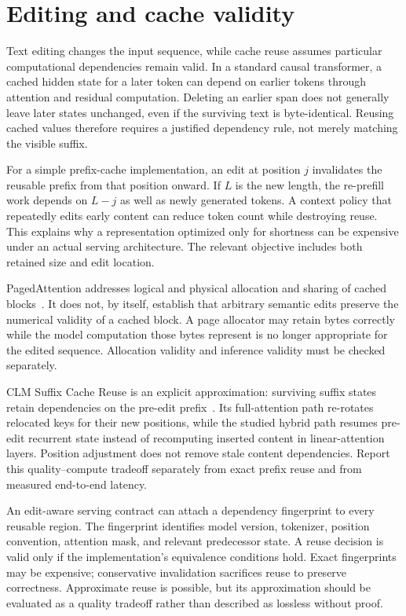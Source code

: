 \section{Editing and cache validity}\label{sec:C12:cache}
Text editing changes the input sequence, while cache reuse assumes particular computational dependencies remain valid. In a standard causal transformer, a cached hidden state for a later token can depend on earlier tokens through attention and residual computation. Deleting an earlier span does not generally leave later states unchanged, even if the surviving text is byte-identical. Reusing cached values therefore requires a justified dependency rule, not merely matching the visible suffix.

For a simple prefix-cache implementation, an edit at position $j$ invalidates the reusable prefix from that position onward. If $L$ is the new length, the re-prefill work depends on $L-j$ as well as newly generated tokens. A context policy that repeatedly edits early content can reduce token count while destroying reuse. This explains why a representation optimized only for shortness can be expensive under an actual serving architecture. The relevant objective includes both retained size and edit location.

PagedAttention addresses logical and physical allocation and sharing of cached blocks~\cite{kwon2023pagedattention}. It does not, by itself, establish that arbitrary semantic edits preserve the numerical validity of a cached block. A page allocator may retain bytes correctly while the model computation those bytes represent is no longer appropriate for the edited sequence. Allocation validity and inference validity must be checked separately.

CLM Suffix Cache Reuse is an explicit approximation: surviving suffix states retain dependencies on the pre-edit prefix~\cite{shao2026context}. Its full-attention path re-rotates relocated keys for their new positions, while the studied hybrid path resumes pre-edit recurrent state instead of recomputing inserted content in linear-attention layers. Position adjustment does not remove stale content dependencies. Report this quality--compute tradeoff separately from exact prefix reuse and from measured end-to-end latency.

An edit-aware serving contract can attach a dependency fingerprint to every reusable region. The fingerprint identifies model version, tokenizer, position convention, attention mask, and relevant predecessor state. A reuse decision is valid only if the implementation's equivalence conditions hold. Exact fingerprints may be expensive; conservative invalidation sacrifices reuse to preserve correctness. Approximate reuse is possible, but its approximation should be evaluated as a quality tradeoff rather than described as lossless without proof.

